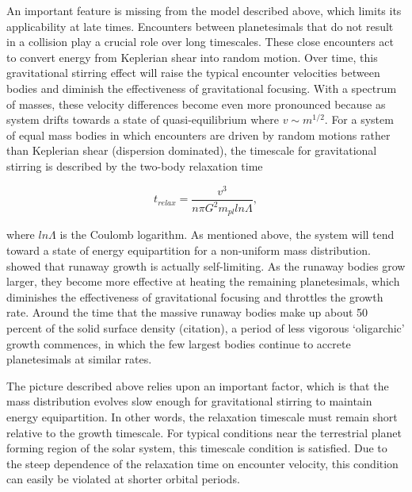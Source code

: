 \documentclass[twocolumn]{aastex63}
\begin{document}
An important feature is missing from the model described above, which limits its applicability at late times. Encounters between planetesimals that do not result in a collision play a crucial role over long timescales. These close encounters act to convert energy from Keplerian shear into random motion. Over time, this gravitational stirring effect will raise the typical encounter velocities between bodies and diminish the effectiveness of gravitational focusing. With a spectrum of masses, these velocity differences become even more pronounced because as system drifts towards a state of quasi-equilibrium where $v \sim m^{1/2}$. For a system of equal mass bodies in which encounters are driven by random motions rather than Keplerian shear (dispersion dominated), the timescale for gravitational stirring is described by the two-body relaxation time \citep{ida93}

\begin{equation}\label{eq:relax}
	t_{relax} = \frac{v^3}{n \pi G^2 m_{pl} ln \Lambda},
\end{equation}

\noindent where $ln \Lambda$ is the Coulomb logarithm. As mentioned above, the system will tend toward a state of energy equipartition for a non-uniform mass distribution. \citet{kokubo98} showed that runaway growth is actually self-limiting. As the runaway bodies grow larger, they become more effective at heating the remaining planetesimals, which diminishes the effectiveness of gravitational focusing and throttles the growth rate. Around the time that the massive runaway bodies make up about 50 percent of the solid surface density (citation), a period of less vigorous `oligarchic' growth commences, in which the few largest bodies continue to accrete planetesimals at similar rates.

The picture described above relies upon an important factor, which is that the mass distribution evolves slow enough for gravitational stirring to maintain energy equipartition. In other words, the relaxation timescale must remain short relative to the growth timescale. For typical conditions near the terrestrial planet forming region of the solar system, this timescale condition is satisfied. Due to the steep dependence of the relaxation time on encounter velocity, this condition can easily be violated at shorter orbital periods.
\end{document}
